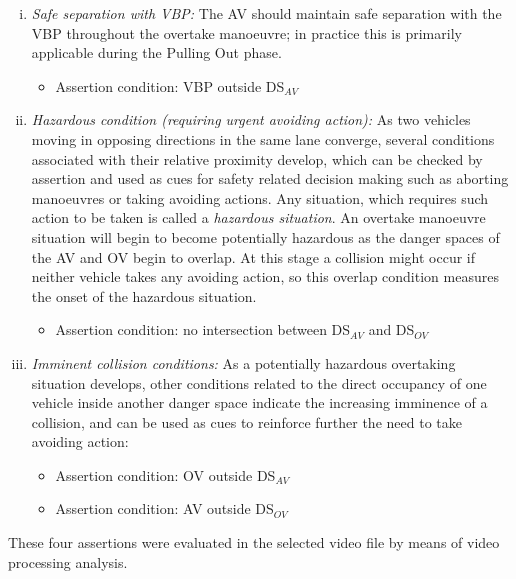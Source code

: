 \begin{enumerate}[i)]
\item \emph{Safe separation with VBP:}
The AV should maintain safe separation with the VBP throughout the overtake manoeuvre; in practice this is primarily applicable during the Pulling Out phase.
\begin{itemize}
	\item Assertion condition: VBP outside DS$_{AV}$
\end{itemize}
\item \emph{Hazardous condition (requiring urgent avoiding action):} 
As two vehicles moving in opposing directions in the same lane converge, several conditions associated with their relative proximity develop, which can be checked by assertion and used as cues for safety related decision making such as aborting manoeuvres or taking avoiding actions. Any situation, which requires such action to be taken is called a \textit{hazardous situation}. An overtake manoeuvre situation will begin to become potentially hazardous as the danger spaces of the AV and OV begin to overlap. At this stage a collision might occur if neither vehicle takes any avoiding action, so this overlap condition measures the onset of the hazardous situation.
\begin{itemize}
	\item Assertion condition: no intersection between DS$_{AV}$ and DS$_{OV}$
\end{itemize}
\item \emph{Imminent collision conditions:}
As a potentially hazardous overtaking situation develops, other conditions related to the direct occupancy of one vehicle inside another danger space indicate the increasing imminence of a collision, and can be used as cues to reinforce further the need to take avoiding action:
\begin{itemize}
	\item Assertion condition: OV outside DS$_{AV}$ 
	\item Assertion condition: AV outside DS$_{OV}$
\end{itemize}
\end{enumerate}
These four assertions were evaluated in the selected video file by means of video processing analysis.




